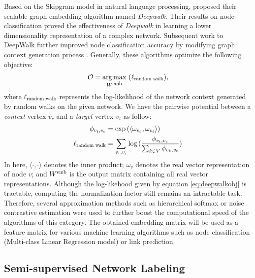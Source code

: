 \documentclass{article}
\DeclareMathOperator*{\argmax}{arg\,max}
\theoremstyle{definition}
\begin{document}
Based on the Skipgram model \cite{skipgram} in natural language 
processing, \citeauthor{deepwalk} proposed their scalable graph embedding 
algorithm named \emph{Deepwalk}. Their results on node classification proved the 
effectiveness of \emph{Deepwalk} in learning a lower dimensionality 
representation of a complex network. Subsequent work to DeepWalk further 
improved node classification accuracy by modifying graph context 
generation process \cite{line,grarep,planetoid,node2vec}. Generally, these
algorithms optimize the following objective:
\begin{equation} 
\mathcal{O} = \argmax_{W^{\scalebox{0.75}{emb}}}\ ( 
\ell_{\scalebox{0.75}{random walk}}),
\label{eq:deepwalkobj}
\end{equation}
where $\ell_{\scalebox{0.75}{random walk}}$ represents the log-likelihood
of the network context generated by random walks on the given network. We have
the pairwise potential between a \emph{context} vertex $v_c$ and a \emph{target}
vertex $v_t$ as follow:
\begin{equation}
\begin{aligned}
	\phi_{v_t,v_c} &= \exp{( \langle \omega_{v_c} ,  \omega_{v_t} \rangle )} \\
	\ell_{\scalebox{0.75}{random walk}} &= \sum_{v_t,v_c}
	\log{(\frac{\phi_{v_t,v_c}}{\sum_{k \in V} \phi_{v_k,v_t}})}
\end{aligned}
\label{eq:deepwalkprob}
\end{equation}
In here, $\langle \cdot , \cdot \rangle$ denotes the inner product; $\omega_v$ 
denotes the real vector representation of node $v$; and $W^{\scalebox{0.75}{emb}}$
is the output matrix containing all real vector representations. Although the 
log-likehood given by equation \ref{eq:deepwalkobj} is tractable, computing the
normalization factor still remains an intractable task. Therefore, several 
approximation methods such as hierarchical softmax \cite{hs,deepwalk} or noise
contrastive estimation \cite{nce,node2vec} were used to further boost the
computational speed of the algorithms of this category. The obtained embedding
matrix will be used as a feature matrix for various machine learning algorithms
such as node classification (Multi-class Linear Regression model) or link 
prediction.

\subsection{Semi-supervised Network Labeling}
\end{document}
